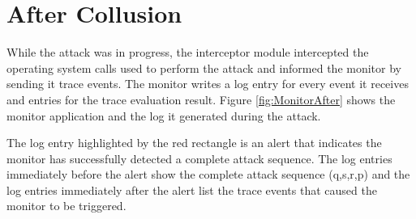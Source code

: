 \section{After Collusion}

While the attack was in progress, the interceptor module intercepted the operating system calls used to perform the attack and informed the monitor by sending it trace events.  The monitor writes a log entry for every event it receives and entries for the trace evaluation result.  Figure \ref{fig:MonitorAfter} shows the monitor application and the log it generated during the attack.  

The log entry highlighted by the red rectangle is an alert that indicates the monitor has successfully detected a complete attack sequence.  The log entries immediately before the alert show the complete attack sequence (q,s,r,p) and the log entries immediately after the alert list the trace events that caused the monitor to be triggered.

\newpage

